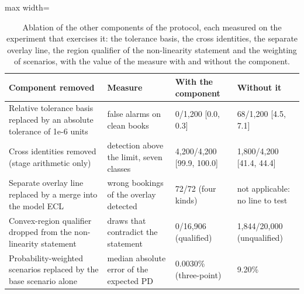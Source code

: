 \begin{table}[htbp]
\centering
\small
\caption{Ablation of the other components of the protocol, each measured on the experiment that exercises it: the tolerance basis, the cross identities, the separate overlay line, the region qualifier of the non-linearity statement and the weighting of scenarios, with the value of the measure with and without the component.}
\label{tab:ablation-components}
\begin{adjustbox}{max width=\textwidth}
\begin{tabular}{p{4.8cm}p{3.6cm}p{3.4cm}p{3.4cm}}
\toprule
Component removed & Measure & With the component & Without it \\
\midrule
Relative tolerance basis replaced by an absolute tolerance of 1e-6 units & false alarms on clean books & 0/1,200 [0.0, 0.3] & 68/1,200 [4.5, 7.1] \\
Cross identities removed (stage arithmetic only) & detection above the limit, seven classes & 4,200/4,200 [99.9, 100.0] & 1,800/4,200 [41.4, 44.4] \\
Separate overlay line replaced by a merge into the model ECL & wrong bookings of the overlay detected & 72/72 (four kinds) & not applicable: no line to test \\
Convex-region qualifier dropped from the non-linearity statement & draws that contradict the statement & 0/16,906 (qualified) & 1,844/20,000 (unqualified) \\
Probability-weighted scenarios replaced by the base scenario alone & median absolute error of the expected PD & 0.0030\% (three-point) & 9.20\% \\
\bottomrule
\end{tabular}
\end{adjustbox}
\end{table}
